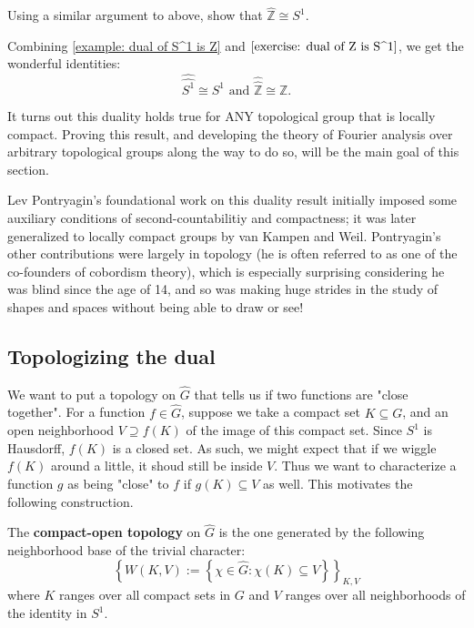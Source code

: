 \documentclass[11pt, x11names, openany]{book}
\newcommand{\zz}{\mathbb{Z}}
\newcommand{\set}[1]{\left\{ #1 \right\}}
\renewcommand{\hat}{\widehat}
\begin{document}
\begin{exercise}
\label{exercise: dual of Z is S^1}
    Using a similar argument to above, show that $\hat{\zz} \cong S^1$.
\end{exercise}

Combining \ref{example: dual of S^1 is Z} and $\ref{exercise: dual of Z is S^1}$, we get the wonderful identities:
\begin{equation*}
    \hat{\hat{S^1}} \cong S^1 \text{ and } \hat{\hat{\zz}} \cong \zz.
\end{equation*}
 
It turns out this duality holds true for ANY topological group that is locally compact. Proving this result, and developing the theory of Fourier analysis over arbitrary topological groups along the way to do so, will be the main goal of this section.

\begin{remark}
    Lev Pontryagin's foundational work on this duality result initially imposed some auxiliary conditions of second-countabilitiy and compactness; it was later generalized to locally compact groups by van Kampen and Weil. Pontryagin's other contributions were largely in topology (he is often referred to as one of the co-founders of cobordism theory), which is especially surprising considering he was blind since the age of 14, and so was making huge strides in the study of shapes and spaces without being able to draw or see!
\end{remark}

\subsection{Topologizing the dual}
\label{subsection: Topologizing the dual}

We want to put a topology on $\hat{G}$ that tells us if two functions are "close together".
For a function $f \in \hat{G}$, suppose we take a compact set $K \subseteq G$, and an open 
neighborhood $V \supseteq f(K)$ of the image of this compact set. Since $S^1$ is Hausdorff,
$f(K)$ is a closed set. As such, we might expect that if we wiggle $f(K)$ around a little, it
shoud still be inside $V$. Thus we want to characterize a function $g$ as being "close" to $f$
if $g(K) \subseteq V$ as well. This motivates the following construction.

\begin{defn}
The \textbf{compact-open topology} on $\hat{G}$ is the one generated by the following neighborhood base
of the trivial character:
\begin{equation*}
    \set{W(K, V) := \set{\chi \in \hat{G} : \chi(K) \subseteq V}}_{K, V}
\end{equation*}
where $K$ ranges over all compact sets in $G$ and $V$ ranges over all neighborhoods of the identity 
in $S^1$.
\end{defn}
\end{document}
